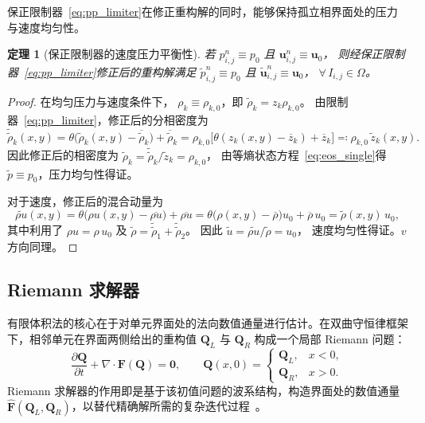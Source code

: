 \documentclass[12pt,a4paper]{article}
\newtheorem{theorem}{定理}[section]
\numberwithin{equation}{section}    %
\begin{document}
保正限制器~\eqref{eq:pp_limiter}在修正重构解的同时，能够保持孤立相界面处的压力与速度均匀性。
\begin{theorem}[保正限制器的速度压力平衡性]
    \label{thm:pp_upv}
    若 $p_{i,j}^n \equiv p_0$ 且 $\bm{u}_{i,j}^n \equiv \bm{u}_0$，
    则经保正限制器~\eqref{eq:pp_limiter}修正后的重构解满足
    $\widetilde{p}_{i,j}^n \equiv p_0$ 且
    $\widetilde{\bm{u}}_{i,j}^n \equiv \bm{u}_0$，
    $\forall\, I_{i,j} \in \Omega$。
\end{theorem}

\begin{proof}
    在均匀压力与速度条件下，
    $\rho_k \equiv \rho_{k,0}$，即
    $\tilde{\rho}_k = z_k\rho_{k,0}$。
    由限制器~\eqref{eq:pp_limiter}，修正后的分相密度为
    \begin{equation}
        \widetilde{\tilde{\rho}}_k(x,y)
        = \theta\bigl(\tilde{\rho}_k(x,y) - \overline{\tilde{\rho}}_k\bigr)
        + \overline{\tilde{\rho}}_k
        = \rho_{k,0}\bigl[\theta(z_k(x,y) - \overline{z}_k) + \overline{z}_k\bigr]
        \eqqcolon \rho_{k,0}\,\widetilde{z}_k(x,y).
    \end{equation}
    因此修正后的相密度为
    $\widetilde{\rho}_k = \widetilde{\tilde{\rho}}_k / \widetilde{z}_k = \rho_{k,0}$，
    由等熵状态方程~\eqref{eq:eos_single}得
    $\widetilde{p} \equiv p_0$，压力均匀性得证。

    对于速度，修正后的混合动量为
    \begin{equation}
        \widetilde{\rho u}(x,y)
        = \theta\bigl(\rho u(x,y) - \overline{\rho u}\bigr) + \overline{\rho u}
        = \theta\bigl(\rho(x,y) - \overline{\rho}\bigr)u_0 + \overline{\rho}\,u_0
        = \widetilde{\rho}(x,y)\,u_0,
    \end{equation}
    其中利用了 $\rho u = \rho\, u_0$ 及
    $\widetilde{\rho} = \widetilde{\tilde{\rho}}_1 + \widetilde{\tilde{\rho}}_2$。
    因此 $\widetilde{u} = \widetilde{\rho u}/\widetilde{\rho} = u_0$，
    速度均匀性得证。$v$ 方向同理。
\end{proof}

\subsection{Riemann 求解器}
\label{sec:riemann}

有限体积法的核心在于对单元界面处的法向数值通量进行估计。在双曲守恒律框架下，相邻单元在界面两侧给出的重构值 $\bm{Q}_L$ 与 $\bm{Q}_R$ 构成一个局部 Riemann 问题：
\begin{equation}
    \frac{\partial \bm{Q}}{\partial t}
    + \nabla \cdot \bm{F}(\bm{Q}) = \bm{0},
    \qquad
    \bm{Q}(x, 0) =
    \begin{cases}
        \bm{Q}_L, & x < 0, \\
        \bm{Q}_R, & x > 0.
    \end{cases}
\end{equation}
Riemann 求解器的作用即是基于该初值问题的波系结构，构造界面处的数值通量 $\hat{\bm{F}}(\bm{Q}_L, \bm{Q}_R)$，以替代精确解所需的复杂迭代过程~\cite{toro2009riemann}。%
\end{document}
